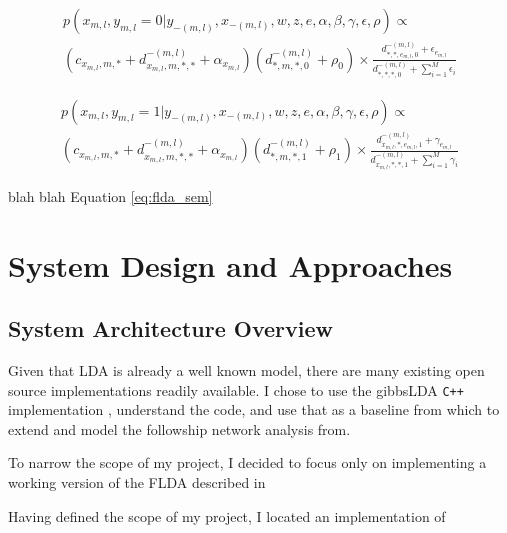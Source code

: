 \documentclass[a4paper]{article}
\begin{document}
\begin{equation}\label{eq:flda_net_0}
  \begin{gathered}
    p(x_{m, l}, y_{m, l} = 0 | y_{-(m, l)}, x_{-(m, l)}, w, z, e, \alpha, \beta, \gamma, \epsilon, \rho) \propto \\
      (c_{x_{m, l}, m, *} + d_{x_{m, l}, m, *, *}^{-(m, l)} + \alpha_{x_{m, l}})(d_{*, m, *, 0}^{-(m, l)} + \rho_0) \times
      \frac{d_{*, *, e_{m, l}, 0}^{-(m, l)} + \epsilon_{e_{m, l}}}
      {d_{*, *, *, 0}^{-(m, l)} + \sum^M_{i = 1}\epsilon_i}
  \end{gathered}
\end{equation}

\begin{equation}\label{eq:flda_net_1}
  \begin{gathered}
    p(x_{m, l}, y_{m, l} = 1 | y_{-(m, l)}, x_{-(m, l)}, w, z, e, \alpha, \beta, \gamma, \epsilon, \rho) \propto \\
      (c_{x_{m, l}, m, *} + d_{x_{m, l}, m, *, *}^{-(m, l)} + \alpha_{x_{m, l}})(d_{*, m, *, 1}^{-(m, l)} + \rho_1) \times
      \frac{d_{x_{m, l}, *, e_{m, l}, 1}^{-(m, l)} + \gamma_{e_{m, l}}}
      {d_{x_{m, l}, *, *, 1}^{-(m, l)} + \sum^M_{i = 1}\gamma_i}
  \end{gathered}
\end{equation}

blah blah Equation \ref{eq:flda_sem}


\section{System Design and Approaches}
\label{sec:approach}
\subsection{System Architecture Overview}
Given that LDA is already a well known model, there are many existing open source implementations readily available. I chose to use the gibbsLDA \verb!C++! implementation \cite{gibbs_lda}, understand the code, and use that as a baseline from which to extend and model the followship network analysis from. 

To narrow the scope of my project, I decided to focus only on implementing a working version of the FLDA described in 

Having defined the scope of my project, I located an implementation of  \cite{gibbs_lda}
\end{document}
